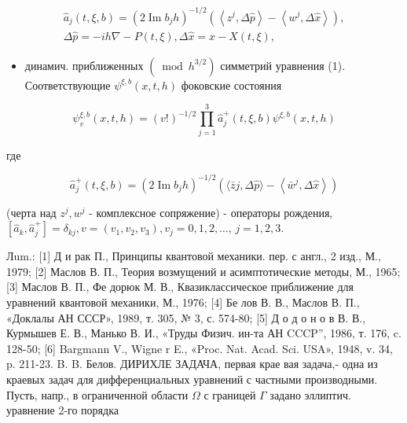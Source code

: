 \documentclass[10pt]{article}
\begin{document}
\[

\begin{gathered}

\hat{a}_{j}(t, \xi, b)=\left(2 \operatorname{Im} b_{j} h\right)^{-1 / 2}\left(\left\langle z^{j}, \Delta \hat{p}\right\rangle-\left\langle w^{j}, \Delta \hat{x}\right\rangle\right), \\

\Delta \hat{p}=-i h \nabla-P(t, \xi), \Delta \hat{x}=x-X(t, \xi),

\end{gathered}

\]



\begin{itemize}

  \item динамич. приближенных $\left(\bmod h^{3 / 2}\right)$ симметрий уравнения (1). Соответствующие $\psi^{\xi, b}(x, t, h)$ фоковские состояния

\end{itemize}



\[

\psi_{v}^{\xi, b}(x, t, h)=(v !)^{-1 / 2} \prod_{j=1}^{3} \hat{a}_{j}^{+}(t, \xi, b) \psi^{\xi, b}(x, t, h)

\]



где



\[

\hat{a}_{j}^{+}(t, \xi, b)=\left(2 \operatorname{Im} b_{j} h\right)^{-1 / 2}\left(\langle\bar{z} j, \Delta \hat{p}\rangle-\left\langle\bar{w}^{j}, \Delta \hat{x}\right\rangle\right)

\]



(черта над $z^{j}, w^{j}$ - комплексное сопряжение) - операторы рождения, $\left[\hat{a}_{k}, \hat{a}_{j}^{+}\right]=\delta_{k j}, v=\left(v_{1}, v_{2}, v_{3}\right), v_{j}=0,1,2, \ldots$, $j=1,2,3$.



Лum.: [1] Д и рак П., Принципы квантовой механики. пер. с англ., 2 изд., М., 1979; [2] Маслов В. П., Теория возмущений и асимптотические методы, М., 1965; [3] Маслов В. П., Фе дорюк М. В., Квазиклассическое приближение для уравнений квантовой механики, М., 1976; [4] Бе лов В. В., Маслов В. П., «Доклалы АН СССР», 1989, т. 305, № 3, с. 574-80; [5] Д о д о н о в В. В., Курмышев Е. В., Манько В. И., «Труды Физич. ин-та АН CCCP”, 1986, т. 176, c. 128-50; [6] Bargmann V., Wigne r E., «Proc. Nat. Acad. Sci. USA», 1948, v. 34, p. 211-23. B. B. Белов. ДИРИХЛЕ ЗАДАЧА, первая крае вая задача,- одна из краевых задач для дифференциальных уравнений с частными производными. Пусть, напр., в ограниченной области $\Omega$ с границей $\Gamma$ задано эллиптич. уравнение 2-го порядка
\end{document}

